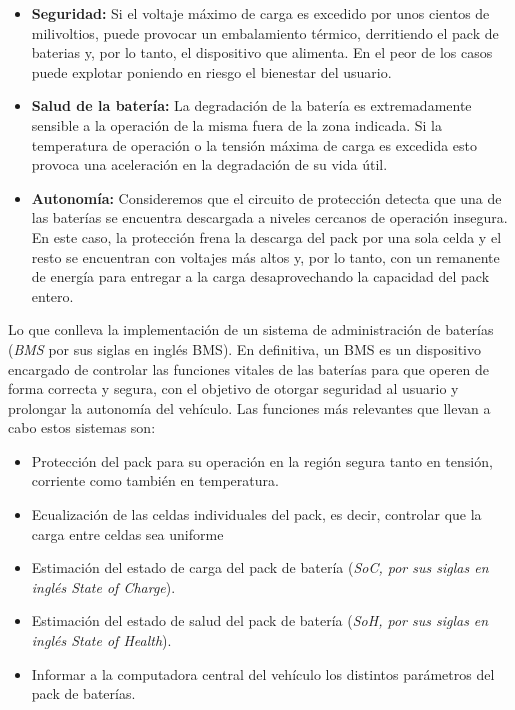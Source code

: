 \documentclass[10pt,a4paper]{article}
\begin{document}
	\begin{itemize}
		\item \textbf{Seguridad:} Si el voltaje máximo de carga es excedido por 
        unos cientos de milivoltios, puede provocar un embalamiento térmico, 
        derritiendo el pack de baterias y, por lo tanto, el dispositivo que 
        alimenta. En el peor de los casos puede explotar poniendo en riesgo el 
        bienestar del usuario.
		\item \textbf{Salud de la batería:} La degradación de la batería es 
        extremadamente sensible a la operación de la misma fuera de la zona 
        indicada. Si la temperatura de operación o la tensión máxima de carga 
        es excedida esto provoca una aceleración en la degradación de su vida 
        útil.
		\item \textbf{Autonomía:} Consideremos que el circuito de protección 
        detecta que una de las baterías se encuentra descargada a niveles 
        cercanos de operación insegura. En este caso, la protección frena la 
        descarga del pack por una sola celda y el resto se encuentran con 
        voltajes más altos y, por lo tanto, con un remanente de energía para 
        entregar a la carga desaprovechando la capacidad del pack entero.
	\end{itemize}
    
    \noindent Lo que conlleva la implementación de un sistema de administración 
    de baterías (\emph{\acrshort{BMS}} por sus siglas en inglés \acrlong{BMS}). En definitiva, un \acrshort{BMS} es un dispositivo encargado de controlar las 
    funciones vitales de las baterías para que operen de forma correcta y segura, 
    con el objetivo de otorgar seguridad al usuario y prolongar la autonomía del 
    vehículo. Las funciones más relevantes que llevan a cabo estos sistemas son:
	
	\begin{itemize}
		\item Protección del pack para su operación en la región segura tanto 
            en tensión, corriente como también en temperatura.
		\item Ecualización de las celdas individuales del pack, es decir,
            controlar que la carga entre celdas sea uniforme
		\item Estimación del estado de carga del pack de batería 
            (\emph{SoC, por sus siglas en inglés State of Charge}).
		\item Estimación del estado de salud del pack de batería 
            (\emph{SoH, por sus siglas en inglés State of Health}).
		\item Informar a la computadora central del vehículo los distintos 
            parámetros del pack de baterías.
	\end{itemize}
\end{document}
